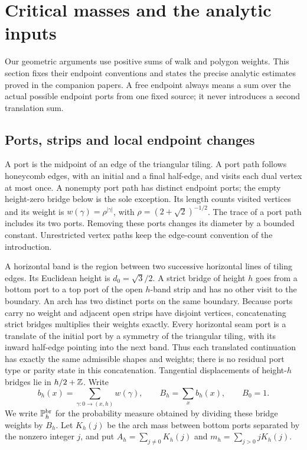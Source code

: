 \section{Critical masses and the analytic inputs}\label{sec:inputs}
Our geometric arguments use positive sums of walk and polygon weights.
This section fixes their endpoint conventions and states the precise
analytic estimates proved in the companion papers. A free endpoint always
means a sum over the actual possible endpoint ports from one fixed source;
it never introduces a second translation sum.

\subsection{Ports, strips and local endpoint changes}
A port is the midpoint of an edge of the triangular tiling. A port path
follows honeycomb edges, with an initial and a final half-edge, and visits
each dual vertex at most once. A nonempty port path has distinct endpoint
ports; the empty height-zero bridge below is the sole exception. Its
length counts visited vertices and its
weight is \(w(\gamma)=\rho^{|\gamma|}\), with
\(\rho=(2+\sqrt2)^{-1/2}\). The trace of a port path includes its two
ports. Removing these ports changes its diameter by a bounded constant.
Unrestricted vertex paths keep the edge-count convention of the introduction.

A horizontal band is the region between two successive horizontal lines
of tiling edges. Its Euclidean height is \(d_0=\sqrt3/2\).
A strict bridge of height \(h\) goes from a bottom port to a top port of
the open \(h\)-band strip and has no other visit to the boundary.
An arch has two distinct ports on the same boundary. Because ports carry
no weight and adjacent open strips have disjoint vertices, concatenating
strict bridges multiplies their weights exactly. Every horizontal seam
port is a translate of the initial port by a symmetry of the triangular
tiling, with its inward half-edge pointing into the next band. Thus each
translated continuation has exactly the same admissible shapes and weights;
there is no residual port type or parity state in this concatenation. Tangential displacements
of height-\(h\) bridges lie in \(h/2+\mathbb Z\). Write
\[
 b_h(x)=\sum_{\gamma:0\to(x,h)}w(\gamma),\qquad
 B_h=\sum_xb_h(x),\qquad B_0=1.
\]
We write \(\mathbb P_h^{\rm br}\) for the probability measure obtained by
dividing these bridge weights by \(B_h\). Let \(K_h(j)\) be the
arch mass between bottom ports separated by the nonzero integer \(j\),
and put \(A_h=\sum_{j\ne0}K_h(j)\) and
\(m_h=\sum_{j>0}jK_h(j)\).

